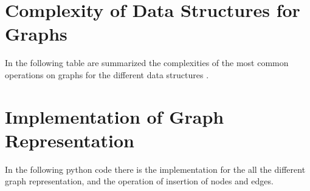 \chapter{Complexity of Data Structures for Graphs}
\label{graphsappendix}
In the following table are summarized the complexities of the most common operations on graphs for the different data structures \cite{goodrich2013data}.

\chapter{Implementation of Graph Representation}
\label{graphimplementationappendix}
In the following python code there is the implementation for the all the different graph representation, and the operation of insertion of nodes and edges.


